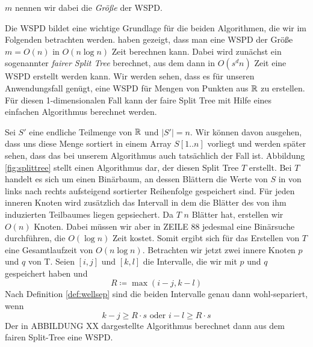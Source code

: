 	\noindent $m$ nennen wir dabei die \emph{Größe} der WSPD.

	Die WSPD bildet eine wichtige Grundlage für die beiden Algorithmen, die wir im Folgenden betrachten werden. \textellipsis haben gezeigt, dass man eine WSPD der Größe $m = O(n)$ in $O(n\log n)$ Zeit berechnen kann. Dabei wird zunächst ein sogenannter \emph{fairer Split Tree} berechnet, aus dem dann in $O(s^dn)$ Zeit eine WSPD erstellt werden kann. Wir werden sehen, dass es für unseren Anwendungsfall genügt, eine WSPD für Mengen von Punkten aus $\mathbb{R}$ zu erstellen. Für diesen 1-dimensionalen Fall kann der faire Split Tree mit Hilfe eines einfachen Algorithmus berechnet werden.
	
	
	
	Sei $S'$ eine endliche Teilmenge von $\mathbb{R}$ und $|S'| = n$. Wir können davon ausgehen, dass uns diese Menge sortiert in einem Array $S[1..n]$ vorliegt und werden später sehen, dass das bei unserem Algorithmus auch tatsächlich der Fall ist. Abbildung \ref{fig:splittree} stellt einen Algorithmus dar, der diesen Split Tree $T$ erstellt. Bei $T$ handelt es sich um einen Binärbaum, an dessen Blättern die Werte von $S$ in von links nach rechts aufsteigend sortierter Reihenfolge gespeichert sind. Für jeden inneren Knoten wird zusätzlich das Intervall in dem die Blätter des von ihm induzierten Teilbaumes liegen gepsiechert.
	Da $T$ $n$ Blätter hat, erstellen wir $O(n)$ Knoten. Dabei müssen wir aber in ZEILE 88 jedesmal eine Binärsuche durchführen, die $O(\log n)$ Zeit kostet. Somit ergibt sich für das Erstellen von $T$ eine Gesamtlaufzeit von $O(n\log n)$.
	Betrachten wir jetzt zwei innere Knoten $p$ und $q$ von T. Seien $[i, j]$ und $[k, l]$ die Intervalle, die wir mit $p$ und $q$ gespeichert haben und 
	\[R \coloneqq \max(i - j, k - l)\]
	Nach Definition \ref{def:wellsep} sind die beiden Intervalle genau dann wohl-separiert, wenn 
	\[k - j \geq R \cdot s \text{ oder } i - l \geq R \cdot s \]
	Der in ABBILDUNG XX dargestellte Algorithmus berechnet dann aus dem fairen Split-Tree eine WSPD.
